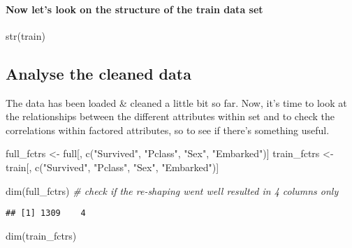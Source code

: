 \documentclass[
]{article}
\newenvironment{Shaded}{\begin{snugshade}}{\end{snugshade}}
\newcommand{\CommentTok}[1]{\textcolor[rgb]{0.56,0.35,0.01}{\textit{#1}}}
\newcommand{\FunctionTok}[1]{\textcolor[rgb]{0.00,0.00,0.00}{#1}}
\newcommand{\NormalTok}[1]{#1}
\newcommand{\OtherTok}[1]{\textcolor[rgb]{0.56,0.35,0.01}{#1}}
\newcommand{\StringTok}[1]{\textcolor[rgb]{0.31,0.60,0.02}{#1}}
\begin{document}
\hypertarget{now-lets-look-on-the-structure-of-the-train-data-set}{%
\paragraph{Now let's look on the structure of the train data
set}\label{now-lets-look-on-the-structure-of-the-train-data-set}}

str(train)

\hypertarget{analyse-the-cleaned-data}{%
\subsection{Analyse the cleaned data}\label{analyse-the-cleaned-data}}

The data has been loaded \& cleaned a little bit so far. Now, it's time
to look at the relationships between the different attributes within set
and to check the correlations within factored attributes, so to see if
there's something useful.

\begin{Shaded}
\begin{Highlighting}[]
\NormalTok{full\_fctrs }\OtherTok{\textless{}{-}}\NormalTok{ full[, }\FunctionTok{c}\NormalTok{(}\StringTok{"Survived"}\NormalTok{, }\StringTok{"Pclass"}\NormalTok{, }\StringTok{"Sex"}\NormalTok{, }\StringTok{"Embarked"}\NormalTok{)]}
\NormalTok{train\_fctrs }\OtherTok{\textless{}{-}}\NormalTok{ train[, }\FunctionTok{c}\NormalTok{(}\StringTok{"Survived"}\NormalTok{, }\StringTok{"Pclass"}\NormalTok{, }\StringTok{"Sex"}\NormalTok{, }\StringTok{"Embarked"}\NormalTok{)]}
\end{Highlighting}
\end{Shaded}

\begin{Shaded}
\begin{Highlighting}[]
\FunctionTok{dim}\NormalTok{(full\_fctrs)  }\CommentTok{\# check if the re{-}shaping went well resulted in 4 columns only}
\end{Highlighting}
\end{Shaded}

\begin{verbatim}
## [1] 1309    4
\end{verbatim}

\begin{Shaded}
\begin{Highlighting}[]
\FunctionTok{dim}\NormalTok{(train\_fctrs)}
\end{Highlighting}
\end{Shaded}
\end{document}
